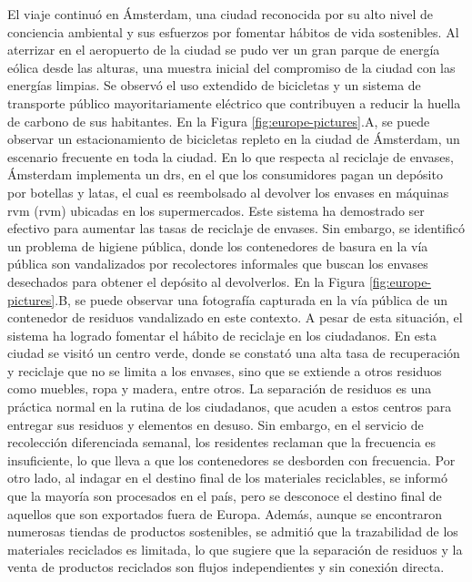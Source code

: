 El viaje continuó en Ámsterdam, una ciudad reconocida por su alto nivel de conciencia ambiental y sus esfuerzos por fomentar hábitos de vida sostenibles. Al aterrizar en el aeropuerto de la ciudad se pudo ver un gran parque de energía eólica desde las alturas, una muestra inicial del compromiso de la ciudad con las energías limpias. Se observó el uso extendido de bicicletas y un sistema de transporte público mayoritariamente eléctrico que contribuyen a reducir la huella de carbono de sus habitantes. En la Figura \ref{fig:europe-pictures}.A, se puede observar un estacionamiento de bicicletas repleto en la ciudad de Ámsterdam, un escenario frecuente en toda la ciudad. En lo que respecta al reciclaje de envases, Ámsterdam implementa un \acrfull{drs}, en el que los consumidores pagan un depósito por botellas y latas, el cual es reembolsado al devolver los envases en máquinas \acrshort{rvm} (\acrfull{rvm}) ubicadas en los supermercados. Este sistema ha demostrado ser efectivo para aumentar las tasas de reciclaje de envases. Sin embargo, se identificó un problema de higiene pública, donde los contenedores de basura en la vía pública son vandalizados por recolectores informales que buscan los envases desechados para obtener el depósito al devolverlos. En la Figura \ref{fig:europe-pictures}.B, se puede observar una fotografía capturada en la vía pública de un contenedor de residuos vandalizado en este contexto. A pesar de esta situación, el sistema ha logrado fomentar el hábito de reciclaje en los ciudadanos. En esta ciudad se visitó un centro verde, donde se constató una alta tasa de recuperación y reciclaje que no se limita a los envases, sino que se extiende a otros residuos como muebles, ropa y madera, entre otros. La separación de residuos es una práctica normal en la rutina de los ciudadanos, que acuden a estos centros para entregar sus residuos y elementos en desuso. Sin embargo, en el servicio de recolección diferenciada semanal, los residentes reclaman que la frecuencia es insuficiente, lo que lleva a que los contenedores se desborden con frecuencia. Por otro lado, al indagar en el destino final de los materiales reciclables, se informó que la mayoría son procesados en el país, pero se desconoce el destino final de aquellos que son exportados fuera de Europa. Además, aunque se encontraron numerosas tiendas de productos sostenibles, se admitió que la trazabilidad de los materiales reciclados es limitada, lo que sugiere que la separación de residuos y la venta de productos reciclados son flujos independientes y sin conexión directa.

